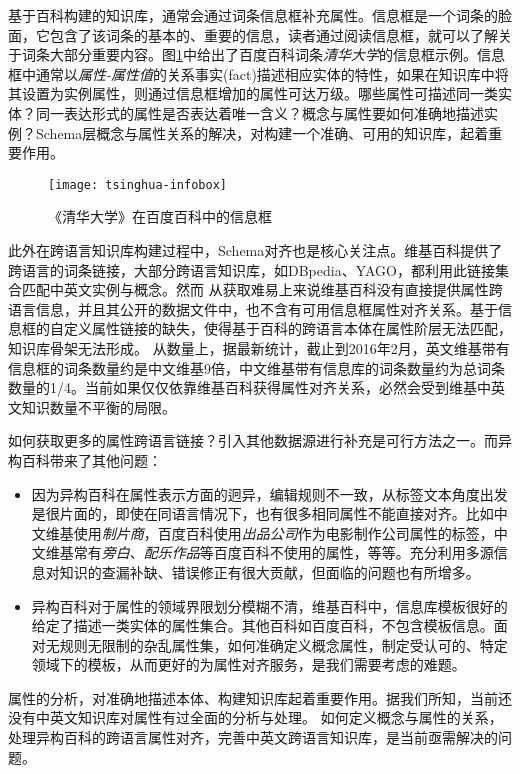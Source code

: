 基于百科构建的知识库，通常会通过词条信息框补充属性。信息框是一个词条的脸面，它包含了该词条的基本的、重要的信息，读者通过阅读信息框，就可以了解关于词条大部分重要内容。图\ref{fig:tsinghua-infobox}中给出了百度百科词条\textit{清华大学}的信息框示例。信息框中通常以\textit{属性-属性值}的关系事实(fact)描述相应实体的特性，如果在知识库中将其设置为实例属性，则通过信息框增加的属性可达万级。哪些属性可描述同一类实体？同一表达形式的属性是否表达着唯一含义？概念与属性要如何准确地描述实例？Schema层概念与属性关系的解决，对构建一个准确、可用的知识库，起着重要作用。

\begin{figure}[H]
  \centering
  \texttt{[image: tsinghua-infobox]}
  \caption{《清华大学》在百度百科中的信息框}
  \label{fig:tsinghua-infobox}
\end{figure}

此外在跨语言知识库构建过程中，Schema对齐也是核心关注点。维基百科提供了跨语言的词条链接，大部分跨语言知识库，如DBpedia、YAGO，都利用此链接集合匹配中英文实例与概念。然而
从获取难易上来说维基百科没有直接提供属性跨语言信息，并且其公开的数据文件中，也不含有可用信息框属性对齐关系。基于信息框的自定义属性链接的缺失，使得基于百科的跨语言本体在属性阶层无法匹配，知识库骨架无法形成。
从数量上，据最新统计，截止到2016年2月，英文维基带有信息框的词条数量约是中文维基9倍，中文维基带有信息库的词条数量约为总词条数量的1/4。当前如果仅仅依靠维基百科获得属性对齐关系，必然会受到维基中英文知识数量不平衡的局限。 

如何获取更多的属性跨语言链接？引入其他数据源进行补充是可行方法之一。而异构百科带来了其他问题：
\begin{itemize}
\item 因为异构百科在属性表示方面的迥异，编辑规则不一致，从标签文本角度出发是很片面的，即使在同语言情况下，也有很多相同属性不能直接对齐。比如中文维基使用\textit{制片商}，百度百科使用\textit{出品公司}作为电影制作公司属性的标签，中文维基常有\textit{旁白}、\textit{配乐作品}等百度百科不使用的属性，等等。充分利用多源信息对知识的查漏补缺、错误修正有很大贡献，但面临的问题也有所增多。
\item 异构百科对于属性的领域界限划分模糊不清，维基百科中，信息库模板很好的给定了描述一类实体的属性集合。其他百科如百度百科，不包含模板信息。面对无规则无限制的杂乱属性集，如何准确定义概念属性，制定受认可的、特定领域下的模板，从而更好的为属性对齐服务，是我们需要考虑的难题。
\end{itemize}

属性的分析，对准确地描述本体、构建知识库起着重要作用。据我们所知，当前还没有中英文知识库对属性有过全面的分析与处理。
如何定义概念与属性的关系，处理异构百科的跨语言属性对齐，完善中英文跨语言知识库，是当前亟需解决的问题。

